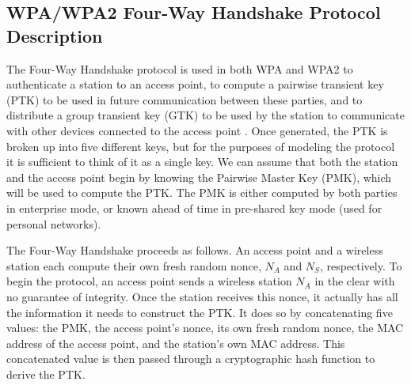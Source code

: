 \documentclass[11pt, twocolumn]{article} %
\begin{document}
{%

\subsection{WPA/WPA2 Four-Way Handshake Protocol Description}
\label{sec:WPA Desc}
The Four-Way Handshake protocol is used in both WPA and WPA2 to authenticate a station to an access point, to compute a pairwise transient key (PTK) to be used in future communication between these parties, and to distribute a group transient key (GTK) to be used by the station to communicate with other devices connected to the access point \cite{liu08}.  Once generated, the PTK is broken up into five different keys, but for the purposes of modeling the protocol it is sufficient to think of it as a single key.  We can assume that both the station and the access point begin by knowing the Pairwise Master Key (PMK), which will be used to compute the PTK.  The PMK is either computed by both parties in enterprise mode, or known ahead of time in pre-shared key mode (used for personal networks).

The Four-Way Handshake proceeds as follows.  An access point and a wireless station each compute their own fresh random nonce, $N_A$ and $N_S$, respectively.  To begin the protocol, an access point sends a wireless station $N_A$ in the clear with no guarantee of integrity.  Once the station receives this nonce, it actually has all the information it needs to construct the PTK.  It does so by concatenating five values: the PMK, the access point's nonce, its own fresh random nonce, the MAC address of the access point, and the station's own MAC address.  This concatenated value is then passed through a cryptographic hash function to derive the PTK.  

}
\end{document}
